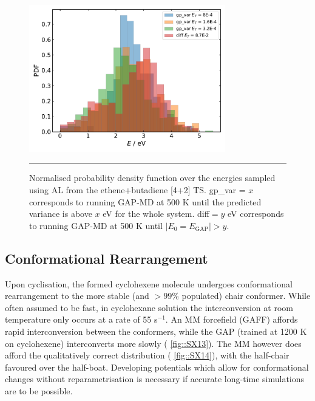 \documentclass[11pt]{article}
\numberwithin{equation}{subsection}
\newcommand{\comment}[1]{}
\begin{document}
\begin{figure}[h!]
	\centering
	\vspace{0.4cm}
	\includegraphics[height=6.4cm]{figSX15.pdf}
	\vspace{0.1cm}
	\hrule
	\vspace{0.1cm}
	\caption{Normalised probability density function over the energies sampled using AL from the ethene+butadiene [4+2] TS. gp\_var = $x$ corresponds to running GAP-MD at 500 K until the predicted variance is above $x$ eV for the whole system. diff$= y$ eV corresponds to running GAP-MD at 500 K until $|E_0 = E_\text{GAP}| > y$.}
	\label{fig::SX15}
\end{figure}

\clearpage
\subsection{Conformational Rearrangement}

\comment{
	TJW:  "interconversion differently, with an MM forcefield (GAFF), while the" - I don't understand the 'with an MM forcefield' clause
	TJW: So we see no interconversion between half-chair and chair for GAP? Do we want to run some repeats as the variation (in the MM especially) is large over 2 ps. Also 	in the caption could you mention which grey line refers to which conformation?
}

Upon cyclisation, the formed cyclohexene molecule undergoes conformational rearrangement to the more  stable (and $>99$\% populated) chair conformer. While often assumed to be fast, in cyclohexane solution the interconversion at room temperature only occurs at a rate of 55 s${}^{-1}.$\cite{Jensen1962} An MM forcefield (GAFF) affords rapid interconversion between the conformers, while the GAP (trained at 1200 K on cyclohexene) interconverts more slowly (\figurename{ \ref{fig::SX13}}). The MM however does afford the qualitatively correct distribution (\figurename{ \ref{fig::SX14}}), with the half-chair favoured over the half-boat. Developing potentials which allow for conformational changes without reparametrisation is necessary if accurate long-time simulations are to be possible.
\end{document}
